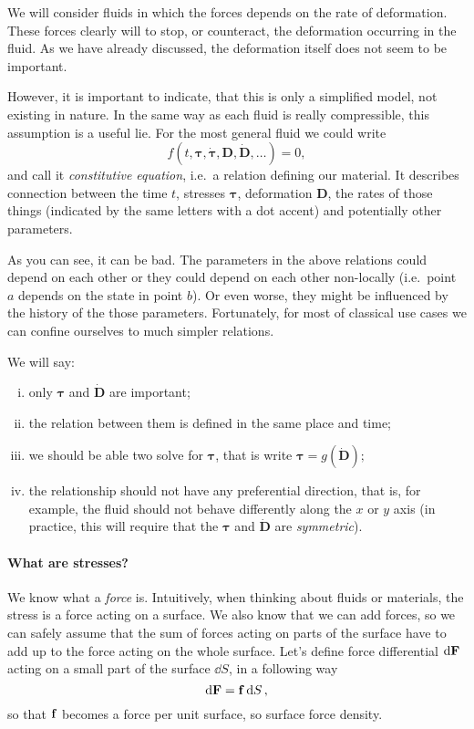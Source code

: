 \documentclass[a4paper]{article}
\begin{document}
We will consider fluids in which the forces depends on the rate of deformation. 
These forces clearly will  to stop, or counteract, the deformation 
occurring in the fluid. As we have already discussed, the deformation itself 
does not seem to be important.

However, it is important to indicate, that this is only a simplified model, 
not existing in nature. In the same way as each fluid is really compressible,
this assumption is a useful lie. For  
the most general fluid we could write
\[
  f(t, \bm{\tau}, \dot{\bm{\tau}}, \bm{D}, \dot{\bm{D}}, \dots) = 0,
\]
and call it \emph{constitutive equation}, i.e.\ a relation defining our material.
It describes connection between the time \(t\), stresses \(\bm{\tau}\), deformation \(\bm{D}\),
the rates of those things (indicated by the same letters with a dot accent) 
and potentially other parameters.

As you can see, it can be bad. The parameters in the above relations could
depend on each other or they could depend on each other non-locally (i.e.\ point
\(a\) depends on the state in point \(b\)). Or even worse, they might be influenced
by the history of the those parameters. Fortunately, for most of classical use 
cases we can confine ourselves to much simpler relations.

We will say:
\begin{enumerate}[(i)]
  \item only \(\bm{\tau}\) and \(\dot{\bm{D}}\) are important;
  \item the relation between them is defined in the same place and time;
  \item we should be able two solve for \(\bm{\tau}\), that is write
    \(
      \bm{\tau} = g(\dot{\bm{D}});
    \)
  \item the relationship should not have any preferential direction, that 
    is, for example, the fluid should not behave differently along the \(x\) 
    or \(y\) axis (in practice, this will require that the \(\bm{\tau}\) and
    \(\dot{\bm{D}}\) are \emph{symmetric}). 
\end{enumerate}

\paragraph{What are stresses?}
We know what a \emph{force} is. Intuitively,
when thinking about fluids or materials, the stress is a force acting on 
a surface. We also know that we can add forces, so we can safely assume that
the sum of forces acting on parts of the surface have to add up to the force 
acting on the whole surface. Let's define force differential \(\dd{\vb{F}}\) acting 
on a small part of the surface \(\dd S\), in a following way
\[
  \dd \vb{F} = \vb{f}\dd{S},
\]
so that \(\vb{f}\) becomes a force per unit surface, so surface force density.
\end{document}
